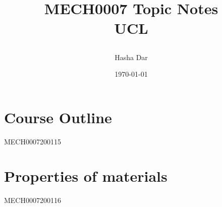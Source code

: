 \documentclass[12pt,a4paper, twoside]{report}
\begin{document}
\title{
  {MECH0007 Topic Notes}\\
  {\large UCL}
  \author{Hasha Dar}
  \date{\today}
}
\maketitle

\tableofcontents
\chapter{Course Outline}
{MECH0007200115}

\chapter{Properties of materials}
{MECH0007200116}
\end{document}

